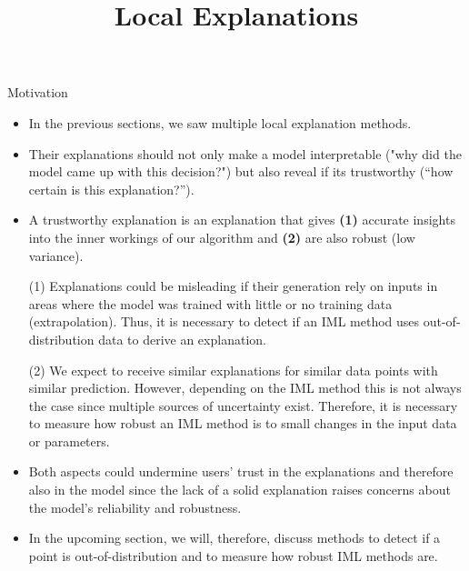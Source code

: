 \documentclass[11pt,compress,t,notes=noshow, xcolor=table]{beamer}
\title{Local Explanations}
\institute{\href{https://compstat-lmu.github.io/lecture_i2ml/}{compstat-lmu.github.io/lecture\_i2ml}}
\date{}
\begin{document}
	










\begin{vbframe}{Motivation}
	\begin{itemize}
		\item In the previous sections, we saw multiple local explanation methods. 
		\item Their explanations should not only make a model interpretable ("why did the model came up with this decision?") but also reveal if its trustworthy (``how certain is this explanation?'').
		\item A trustworthy explanation is an explanation that gives \textbf{(1)} accurate insights into the inner workings of our algorithm and \textbf{(2)} are also robust (low variance). 
		\item[(1)] Explanations could be misleading if their generation rely on inputs in areas where the model was trained with little or no training data (extrapolation). Thus, it is necessary to detect if an IML method uses out-of-distribution data to derive an explanation. 
		\item[(2)] We expect to receive similar explanations for similar data points with similar prediction. However, depending on the IML method this is not always the case since multiple sources of uncertainty exist. Therefore, it is necessary to measure how robust an IML method is to small changes in the input data or parameters. 
		\item Both aspects could undermine users' trust in the explanations and therefore also in the model since the lack of a solid explanation raises concerns about the model's reliability and robustness. 
		\item In the upcoming section, we will, therefore, discuss methods to detect if a point is out-of-distribution and to measure how robust IML methods are.
	\end{itemize}
\end{vbframe}
\end{document}

